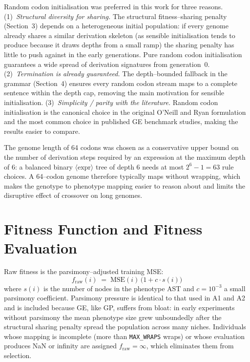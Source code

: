 \documentclass[12pt,a4paper]{article}
\begin{document}
Random codon initialisation was preferred in this work for three
reasons. (1)~\emph{Structural diversity for sharing.} The structural
fitness--sharing penalty (Section~3) depends on a heterogeneous initial
population: if every genome already shares a similar derivation
skeleton (as sensible initialisation tends to produce because it draws
depths from a small ramp) the sharing penalty has little to push
against in the early generations. Pure random codon initialisation
guarantees a wide spread of derivation signatures from generation~0.
(2)~\emph{Termination is already guaranteed.} The depth--bounded
fallback in the grammar (Section~4) ensures every random codon stream
maps to a complete sentence within the depth cap, removing the main
motivation for sensible initialisation. (3)~\emph{Simplicity / parity
with the literature.} Random codon initialisation is the canonical
choice in the original O'Neill and Ryan formulation and the most common
choice in published GE benchmark studies, making the results easier to
compare.

The genome length of 64 codons was chosen as a conservative upper bound
on the number of derivation steps required by an expression at the
maximum depth of 6: a balanced binary $\langle\text{expr}\rangle$ tree
of depth 6 needs at most $2^{6}-1 = 63$ rule choices. A 64--codon genome
therefore typically maps without wrapping, which makes the genotype to
phenotype mapping easier to reason about and limits the disruptive
effect of crossover on long genomes.

\section{Fitness Function and Fitness Evaluation}

Raw fitness is the parsimony--adjusted training MSE:
\begin{equation}
f_{\text{raw}}(i) \;=\; \mathrm{MSE}(i) \,\bigl(1 + c \cdot s(i)\bigr)
\end{equation}
where $s(i)$ is the number of nodes in the phenotype AST and
$c = 10^{-3}$ a small parsimony coefficient. Parsimony pressure is
identical to that used in A1 and A2 and is included because GE, like
GP, suffers from bloat: in early experiments without parsimony the mean
phenotype size grew unboundedly after the structural sharing penalty
spread the population across many niches. Individuals whose mapping is
incomplete (more than \texttt{MAX\_WRAPS} wraps) or whose evaluation
produces NaN or infinity are assigned $f_{\text{raw}} = \infty$, which
eliminates them from selection.
\end{document}
